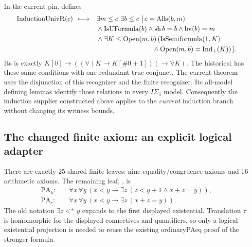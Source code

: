 In the current pin,
 defines
\begin{align*}
\operatorname{InductionUnivR}(c)\ \longleftrightarrow\quad &\exists m\le c\ \exists b\le c\ [\,
 c=\operatorname{Alls}(b,m)\\
 &{}\land\operatorname{IsUFormula}(b)
 \land\operatorname{sh}b=b\land\operatorname{bv}(b)=m\\
 &{}\land\exists K\le\operatorname{Open}(m,b)\,
  (\operatorname{IsSemiformula}(1,K)\\
 &\hspace{29mm}{}\land\operatorname{Open}(m,b)=\operatorname{Ind}_{+}(K))\,].
\end{align*}
Its  is exactly
$K[0]\to((\forall(K\to K[\#0+1]))\to\forall K)$.
The historical  has these same
conditions with one redundant true conjunct.  The current theorem
 uses the disjunction of this recognizer
and the finite  recognizer.  Its all-model defining
lemmas identify those relations in every $I\Sigma_1$ model.
Consequently the induction supplier constructed above applies to the
\emph{current} induction branch without changing its witness bounds.

\subsection{The changed finite axiom: an explicit logical adapter}

There are exactly 25 shared finite leaves: nine equality/congruence
axioms and 16 arithmetic axioms.  The remaining leaf,
, is
\begin{align*}
 \mathrm{PA}_h:\quad&
 \forall x\,\forall y\,
   (x<y\to\exists z\,(z<y+1\land x+z=y)),\\
 \mathrm{PA}_c:\quad&
 \forall x\,\forall y\,
   (x<y\to\exists z\,(x+z=y)).
\end{align*}
The old notation $\exists z<^{+}y$ expands to the first displayed
existential.  Translation $\tau$ is homomorphic for the displayed
connectives and quantifiers, so only a logical existential projection is
needed to reuse the existing ordinaryPAeq proof of the stronger formula.

